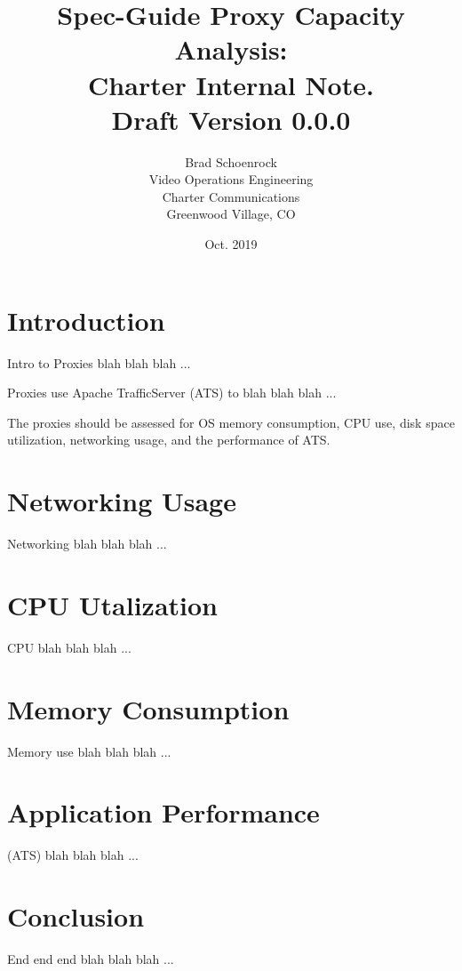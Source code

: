 \documentclass{article}
\author{Brad Schoenrock\\Video Operations Engineering\\Charter Communications\\Greenwood Village, CO}
\title{Spec-Guide Proxy Capacity Analysis:\\Charter Internal Note.\\Draft Version 0.0.0}
\date{Oct. 2019}
\begin{document}
\maketitle
\newpage

\tableofcontents
\newpage



\section{Introduction}
\label{SECTION-Introduction}

Intro to Proxies blah blah blah ... 

Proxies use Apache TrafficServer (ATS) to blah blah blah ...

The proxies should be assessed for OS memory consumption, CPU use, disk space utilization, networking usage, and the performance of ATS. 



\section{Networking Usage}
\label{SECTION-Networking}

Networking blah blah blah ... 



\section{CPU Utalization}
\label{SECTION-CPUUse}

CPU blah blah blah ... 



\section{Memory Consumption}
\label{SECTION-Memory}

Memory use blah blah blah ...



\section{Application Performance}
\label{SECTION-APPPerf}

(ATS) blah blah blah ... 



\section{Conclusion}
\label{SECTION-Conclusion}

End end end blah blah blah ...
\end{document}
